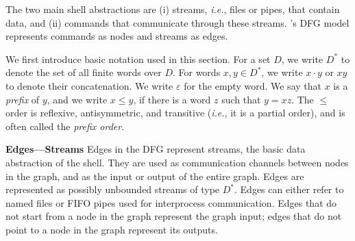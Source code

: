 \documentclass[letterpaper,twocolumn,10pt]{article}
\newcommand{\ie}{{\em i.e.}, }
\newcommand{\heading}[1]{\vspace{4pt}\noindent\textbf{#1}\enspace}
\newcommand{\TODO}[1]{\hl{\textbf{TODO:} #1}\xspace}
\newcommand{\nv}[1]{[{\color{cyan}nv: #1}]}
\newcommand{\tr}[1]{} %
\newcommand{\kstar}{^{\textstyle *}}
\newcommand{\eps}{\varepsilon}
\begin{document}
The two main shell abstractions are
  (i) streams, \ie files or pipes, that contain data, and
  (ii) commands that communicate through these streams.
\sys's DFG model represents commands as nodes and streams as edges.

We first introduce basic notation used in this section.
For a set $D$, we write $D\kstar$ to denote the set of all finite words over $D$.
For words $x, y \in D\kstar$, we write $x \cdot y$ or $xy$ to denote their concatenation.
We write $\eps$ for the empty word.
We say that $x$ is a \emph{prefix} of $y$, and we write $x \leq y$, if there is a word $z$ such that $y = xz$.
The $\leq$ order is reflexive, antisymmetric, and transitive (\ie it is a partial order), and is often called the \emph{prefix order}.


\heading{Edges---Streams}
Edges in the DFG represent streams, the basic data abstraction of the shell.
They are used as communication channels between nodes in the graph, and as the input or output of the entire graph.
Edges are represented as possibly unbounded streams of type $D\kstar$.
Edges can either refer to named files or FIFO pipes used for interprocess communication.
Edges that do not start from a node in the graph represent the graph input;
  edges that do not point to a node in the graph represent its outputs.





\end{document}
